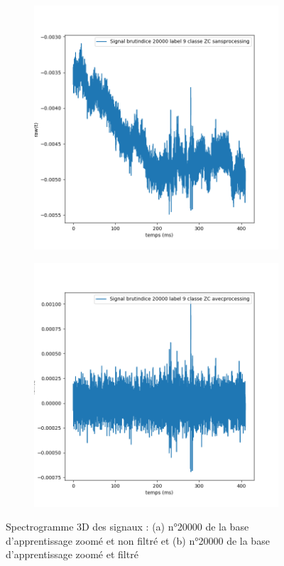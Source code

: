 \begin{figure}[!h]
\centering
  \begin{subfigure}[b]{0.45\textwidth}
    \includegraphics[width=\textwidth]{./images/indice20000Spectro1Dlabel9classeZCsansprocessingsanszoom.png}
  \end{subfigure}
  \begin{subfigure}[b]{0.45\textwidth}
    \includegraphics[width=\textwidth]{./images/indice20000Spectro1Dlabel9classeZCavecprocessingsanszoom.png}
  \end{subfigure}
  \caption{Spectrogramme 3D des signaux : (a) n°20000 de la base d'apprentissage zoomé et non filtré et (b) n°20000 de la base d'apprentissage zoomé et filtré%
\label{fig:20000zoomavecetsansfiltrage}}
\end{figure}

